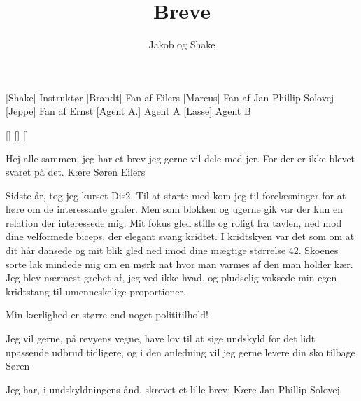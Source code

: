\documentclass[a4paper,11pt]{article}
\title{Breve}
\author{Jakob og Shake}
\begin{document}
\maketitle

\begin{roles}
[Shake] Instruktør
[Brandt] Fan af Eilers
[Marcus] Fan af Jan Phillip Solovej
[Jeppe] Fan af Ernst
[Agent A.] Agent A
[Lasse] Agent B
\end{roles}

\begin{props}
[]
[]
[]
\end{props}

\begin{sketch}

 Hej alle sammen, jeg har et brev jeg gerne vil dele med jer. For der er ikke blevet svaret på det.
Kære Søren Eilers


 Sidste år, tog jeg kurset Dis2. Til at starte med kom jeg til forelæsninger for at høre om de interessante grafer. Men som blokken og ugerne gik var der kun en relation der interessede mig. Mit fokus gled stille og roligt fra tavlen, ned mod dine velformede biceps, der elegant svang kridtet. 
I kridtskyen var det som om at dit hår dansede og mit blik gled ned imod dine mægtige størrelse 42. Skoenes sorte lak mindede mig om en mørk nat hvor man varmes af den man holder kær.
Jeg blev nærmest grebet af, jeg ved ikke hvad, og pludselig voksede min egen kridtstang til umenneskelige proportioner.


 Min kærlighed er større end noget polititilhold!


 Jeg vil gerne, på revyens vegne, have lov til at sige undskyld for det lidt upassende udbrud tidligere, og i den anledning vil jeg gerne levere din sko tilbage Søren


 Jeg har, i undskyldningens ånd. skrevet et lille brev:
Kære Jan Phillip Solovej



\end{sketch}
\end{document}
